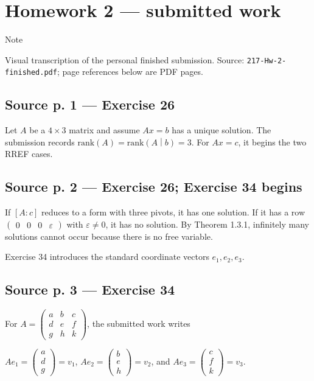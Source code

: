 \section{Homework 2 --- submitted work}

\begin{qlnote}{Note}

Visual transcription of the personal finished submission. Source: \texttt{217-Hw-2-finished.pdf}; page references below are PDF pages.

\end{qlnote}

\subsection{Source p. 1 --- Exercise 26}

Let \(A\) be a \(4 \times 3\) matrix and assume \(Ax = b\) has a unique solution. The submission records \(\text{rank}(A) = \text{rank}\left( A \middle| b \right) = 3\). For \(Ax = c\), it begins the two RREF cases.

\subsection{Source p. 2 --- Exercise 26; Exercise 34 begins}

If \(\left\lbrack {A:c} \right\rbrack\) reduces to a form with three pivots, it has one solution. If it has a row \(\begin{pmatrix}
0 & 0 & 0 & \varepsilon
\end{pmatrix}\) with \(\varepsilon \neq 0\), it has no solution. By Theorem 1.3.1, infinitely many solutions cannot occur because there is no free variable.

Exercise 34 introduces the standard coordinate vectors \(e_{1},e_{2},e_{3}\).

\subsection{Source p. 3 --- Exercise 34}

For \(A = \begin{pmatrix}
a & b & c \\
d & e & f \\
g & h & k
\end{pmatrix}\), the submitted work writes

\(Ae_{1} = \begin{pmatrix}
a \\
d \\
g
\end{pmatrix} = v_{1}\), \(Ae_{2} = \begin{pmatrix}
b \\
e \\
h
\end{pmatrix} = v_{2}\), and \(Ae_{3} = \begin{pmatrix}
c \\
f \\
k
\end{pmatrix} = v_{3}\).

